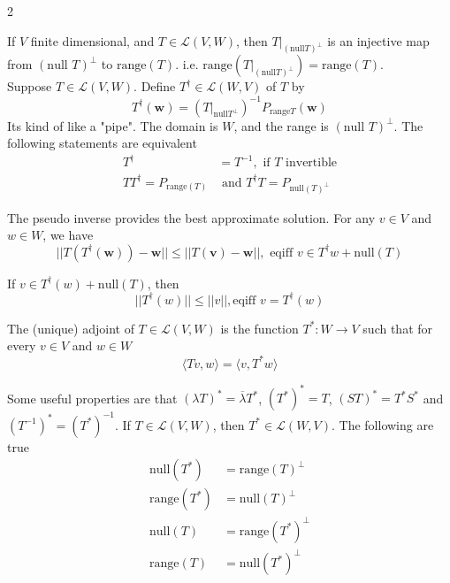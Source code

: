 \documentclass[a4paper,8pt]{extarticle} %
\newcommand{\mybox}[2]{
    \begin{tcolorbox}[colback=lightblue!5!white,colframe=lightblue!75!black,boxsep=1pt,arc=0pt,outer arc=0pt,coltext=black,title={\textcolor{black}{#1}}, before skip=2pt, after skip=2pt]
        #2
    \end{tcolorbox}
}
\begin{document}
\begin{multicols*}{2}
\mybox{Pseudoinverse}{
If $V$ finite dimensional, and $T\in \mathcal{L}(V, W)$, then $T|_{(\text{null} T)^{\perp}}$ is an injective map from $(\text{null } T)^{\perp}$ to $\text{range}(T)$. i.e. $\text{range}(T|_{(\text{null} T)^{\perp}})=\text{range}(T)$.\\

Suppose $T\in \mathcal{L}(V, W)$. Define $T^{\dagger}\in\mathcal{L}(W, V)$ of $T$ by
\begin{equation}
    T^{\dagger}(\mathbf{w})=(T|_{\text{null} T^{\perp}})^{-1}P_{\text{range}T}(\mathbf{w})
\end{equation}
Its kind of like a "pipe". The domain is $W$, and the range is $(\text{null } T)^{\perp}$. The following statements are equivalent
\begin{subequations}
    \begin{align}
        T^{\dagger}&= T^{-1}, \text{ if $T$ invertible}\\
        TT^{\dagger}=P_{\text{range}(T)}&\text{ and } T^{\dagger}T=P_{\text{null}(T)^{\perp}}
    \end{align}
\end{subequations}

The pseudo inverse provides the best approximate solution. For any $v\in V$ and $w \in W$, we have
\begin{equation}
        ||T(T^{\dagger}(\mathbf{w}))-\mathbf{w}||\leq||T(\mathbf{v})-\mathbf{w}||, \text{ eqiff $v\in T^{\dagger}w+\text{null}(T)$}
\end{equation}

If $v \in T^{\dagger}(w)+\text{null}(T)$, then
\begin{equation}
    ||T^{\dagger}(w)||\leq||v||, \text{eqiff $v = T^{\dagger}(w)$}
\end{equation}
}

\mybox{Adjoint (self adjoint $\Rightarrow$ adjoint)}{
The (unique) adjoint of $T\in \mathcal{L}(V, W)$ is the function $T^{*}: W\rightarrow V$ such that for every $v \in V$ and $w \in W$
\begin{equation}
    \langle Tv, w\rangle=\langle v, T^{*}w\rangle
\end{equation}

Some useful properties are that $(\lambda T)^{*} = \overline{\lambda}T^{*}$, $(T^{*})^{*}=T$, $(ST)^{*}=T^{*}S^{*}$ and $(T^{-1})^{*}=(T^{*})^{-1}$. If $T\in \mathcal{L}(V, W)$, then $T^{*}\in\mathcal{L}(W, V)$. The following are true
\begin{subequations}
    \begin{align}
        \text{null}(T^{*})&=\text{range}(T)^{\perp}\\
        \text{range}(T^{*})&=\text{null}(T)^{\perp}\\
        \text{null}(T)&=\text{range}(T^{*})^{\perp}\\
        \text{range}(T)&=\text{null}(T^{*})^{\perp}
    \end{align}
\end{subequations}

}
\end{multicols*}
\end{document}
